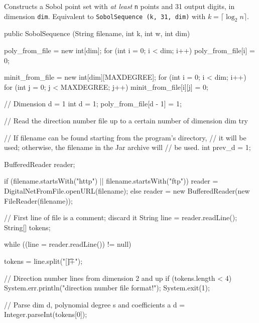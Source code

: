 \begin{tabb}
  Constructs a Sobol point set with \emph{at least} \texttt{n} points  and 31 
   output digits, in dimension \texttt{dim}. Equivalent to 
  \texttt{SobolSequence (k, 31, dim)} with $k = \lceil \log_2 n\rceil$.
\end{tabb}
\begin{htmlonly}
\end{htmlonly}
\begin{code} 

   public SobolSequence (String filename, int k, int w, int dim) \begin{hide} {

      poly_from_file = new int[dim];
      for (int i = 0; i < dim; i++)
         poly_from_file[i] = 0;

      minit_from_file = new int[dim][MAXDEGREE];
      for (int i = 0; i < dim; i++) {
         for (int j = 0; j < MAXDEGREE; j++) {
            minit_from_file[i][j] = 0;
         }
      }

      // Dimension d = 1
      int d = 1;
      poly_from_file[d - 1] = 1;

      // Read the direction number file up to a certain number of dimension dim
      try {
         // If filename can be found starting from the program's directory,
         // it will be used; otherwise, the filename in the Jar archive will
         // be used.
         int prev_d = 1;

         BufferedReader reader;

         if (filename.startsWith("http") || filename.startsWith("ftp"))
            reader = DigitalNetFromFile.openURL(filename);
         else
            reader = new BufferedReader(new FileReader(filename));

         // First line of file is a comment; discard it
         String line = reader.readLine();
         String[] tokens;

         while ((line = reader.readLine()) != null) {
            tokens = line.split("[\t ]+");

            // Direction number lines from dimension 2 and up
            if (tokens.length < 4) {
               System.err.println("\nBad direction number file format!\n");
               System.exit(1);
            }

            // Parse dim d, polynomial degree s and coefficients a
            d = Integer.parseInt(tokens[0]);

}}}
\end{hide}
\end{code}
